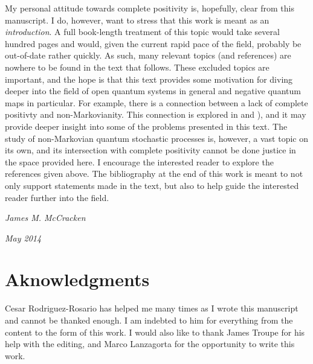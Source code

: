 My personal attitude towards complete positivity is, hopefully, clear from this manuscript.  I do, however, want to stress that this work is meant as an {\em introduction}.  A full book-length treatment of this topic would take several hundred pages and would, given the current rapid pace of the field, probably be out-of-date rather quickly.  As such, many relevant topics (and references) are nowhere to be found in the text that follows.  These excluded topics are important, and the hope is that this text provides some motivation for diving deeper into the field of open quantum systems in general and negative quantum maps in particular.  For example, there is a connection between a lack of complete positivty and non-Markovianity.  This connection is explored in \cite{Rodríguez2012} and \cite{Mazzola2012}), and it may provide deeper insight into some of the problems presented in this text.  The study of non-Markovian quantum stochastic processes is, however, a vast topic on its own, and its intersection with complete positivity cannot be done justice in the space provided here.  I encourage the interested reader to explore the references given above.  The bibliography at the end of this work is meant to not only support statements made in the text, but also to help guide the interested reader further into the field.

\hfill{\em  James M. McCracken}

\hfill{\em May 2014}




\newpage
\chapter*{Aknowledgments}
Cesar Rodriguez-Rosario has helped me many times as I wrote this manuscript and cannot be thanked enough.  I am indebted to him for everything from the content to the form of this work.  I would also like to thank James Troupe for his help with the editing, and Marco Lanzagorta for the opportunity to write this work.

\newpage

